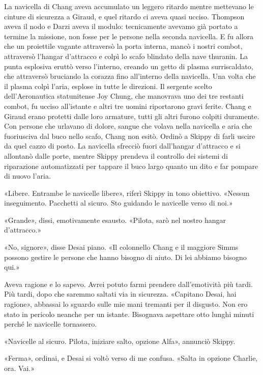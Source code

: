 La navicella di Chang aveva accumulato un leggero ritardo mentre
mettevano le cinture di sicurezza a Giraud, e quel ritardo ci aveva
quasi ucciso. Thompson aveva il nodo e Darzi aveva il modulo:
tecnicamente avevamo già portato a termine la missione, non fosse per le
persone nella seconda navicella. E fu allora che un proiettile vagante
attraversò la porta interna, mancò i nostri combot, attraversò l'hangar
d'attracco e colpì lo scafo blindato della nave thuranin. La punta
esplosiva eruttò verso l'interno, creando un getto di plasma
surriscaldato, che attraversò bruciando la corazza fino all'interno
della navicella. Una volta che il plasma colpì l'aria, esplose in tutte
le direzioni. Il sergente scelto dell'Aeronautica statunitense Joy
Chung, che manovrava uno dei tre restanti combot, fu ucciso all'istante
e altri tre uomini riportarono gravi ferite. Chang e Giraud erano
protetti dalle loro armature, tutti gli altri furono colpiti duramente.
Con persone che urlavano di dolore, sangue che volava nella navicella e
aria che fuoriusciva dal buco nello scafo, Chang non esitò. Ordinò a
Skippy di farli uscire da quel cazzo di posto. La navicella sfrecciò
fuori dall'hangar d'attracco e si allontanò dalle porte, mentre Skippy
prendeva il controllo dei sistemi di riparazione automatizzati per
tappare il buco largo quanto un dito e far pompare di nuovo l'aria.

«Libere. Entrambe le navicelle libere», riferì Skippy in tono obiettivo.
«Nessun inseguimento. Pacchetti al sicuro. Sto guidando le navicelle
verso di noi.»

«Grande», dissi, emotivamente esausto. «Pilota, sarò nel nostro hangar
d'attracco.»

«No, signore», disse Desai piano. «Il colonnello Chang e il maggiore
Simms possono gestire le persone che hanno bisogno di aiuto. Di lei
abbiamo bisogno qui.»

Aveva ragione e lo sapevo. Avrei potuto farmi prendere dall'emotività
più tardi. Più tardi, dopo che saremmo saltati via in sicurezza.
«Capitano Desai, hai ragione», abbassai lo sguardo sulle mie mani
tremanti per il disgusto. Non ero stato in pericolo neanche per un
istante. Bisognava aspettare otto lunghi minuti perché le navicelle
tornassero.

\hfill\break

«Navicelle al sicuro. Pilota, iniziare salto, opzione Alfa», annunciò
Skippy.

«Ferma», ordinai, e Desai si voltò verso di me confusa. «Salta in
opzione Charlie, ora. Vai.»

